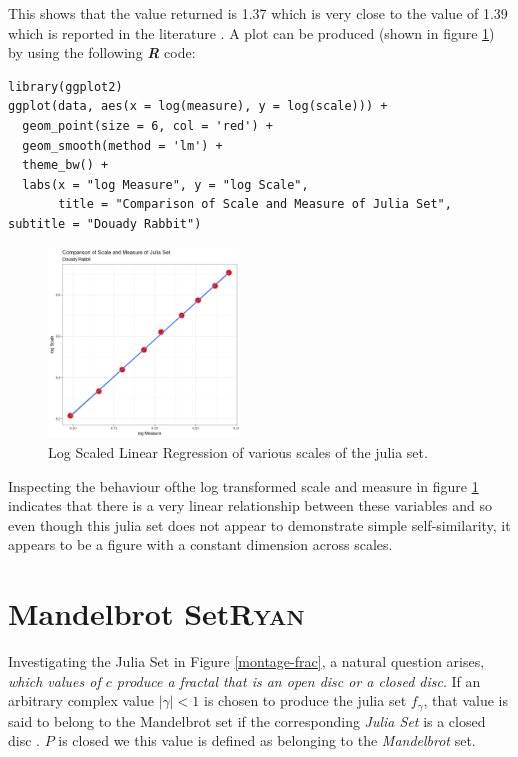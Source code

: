 \documentclass[a4paper,11pt,twoside]{article}
\begin{document}
This shows that the value returned is 1.37 which is very close to the value of
1.39 which is reported in the literature
\cite{mcmullenHausdorffDimensionConformal1998}. A plot can be produced (shown in figure \ref{fig:lin-reg-dim}) by using the following \textbf{\emph{R}} code:

\begin{verbatim}
library(ggplot2)
ggplot(data, aes(x = log(measure), y = log(scale))) +
  geom_point(size = 6, col = 'red') +
  geom_smooth(method = 'lm') +
  theme_bw() +
  labs(x = "log Measure", y = "log Scale",
       title = "Comparison of Scale and Measure of Julia Set", subtitle = "Douady Rabbit")
\end{verbatim}

\begin{figure}[htbp]
\centering
\includegraphics[width=0.45\textwidth]{media/r-ggplot-linear-reg-julia.png}
\caption{\label{fig:lin-reg-dim}Log Scaled Linear Regression of various scales of the julia set.}
\end{figure}


Inspecting the behaviour ofthe log transformed scale and measure in figure
\ref{fig:lin-reg-dim} indicates that there is a very linear relationship between these
variables and so even though this julia set does not appear to demonstrate
simple self-similarity, it appears to be a figure with a constant dimension
across scales.
\section{Mandelbrot Set\hfill{}\textsc{Ryan}}
\label{mandlebrot-set}
Investigating the Julia Set in Figure \ref{montage-frac}, a natural question arises, \emph{which values of \(c\)
produce a fractal that is an open disc or a closed disc}. If an arbitrary complex value \(\left\lvert \gamma \right \rvert < 1\)
is chosen to produce the julia set \(f_{\gamma}\), that value is said to belong to the Mandelbrot set if the corresponding \emph{Julia Set} is a closed disc \cite[Ch. 14]{peitgenChaosFractalsNew2004}.
\(P\) is closed we this value is defined as belonging to the \emph{Mandelbrot} set.
\end{document}
